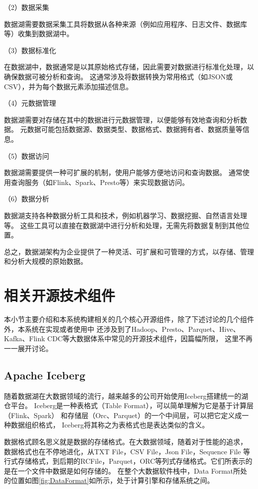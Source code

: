 （2）数据采集

数据湖需要数据采集工具将数据从各种来源（例如应用程序、日志文件、数据库等）收集到数据湖中。

（3）数据标准化

在数据湖中，数据通常是以其原始格式存储，因此需要对数据进行标准化处理，以确保数据可被分析和查询。
这通常涉及将数据转换为常用格式（如JSON或CSV），并为每个数据元素添加描述信息。

（4）元数据管理

数据湖需要对存储在其中的数据进行元数据管理，以便能够有效地查询和分析数据。
元数据可能包括数据源、数据类型、数据格式、数据拥有者、数据质量等信息。

（5）数据访问

数据湖需要提供一种可扩展的机制，使用户能够方便地访问和查询数据。
通常使用查询服务（如Flink、Spark、Presto等）来实现数据访问。

（6）数据分析

数据湖支持各种数据分析工具和技术，例如机器学习、数据挖掘、自然语言处理等。
这些工具可以直接在数据湖中进行分析和处理，无需先将数据复制到其他位置。

总之，数据湖架构为企业提供了一种灵活、可扩展和可管理的方式，以存储、管理和分析大规模的原始数据。

\section{相关开源技术组件}

本小节主要介绍和本系统构建相关的几个核心开源组件，除了下述讨论的几个组件外，本系统在实现或者使用中
还涉及到了Hadoop、Presto、Parquet、Hive、Kafka、Flink CDC等大数据体系中常见的开源技术组件，因篇幅所限，
这里不再一一展开讨论。

\subsection{Apache Iceberg}

随着数据湖在大数据领域的流行，越来越多的公司开始使用Iceberg搭建统一的湖仓平台。
Iceberg是一种表格式（Table Format），可以简单理解为它是基于计算层（Flink、Spark）
和存储层（Orc\cite{9}、Parquet\cite{10}）的一个中间层，可以把它定义成一种数据组织格式，
Iceberg将其称之为表格式也是表达类似的含义。

数据格式顾名思义就是数据的存储格式。在大数据领域，随着对于性能的追求，
数据格式也在不停地进化，从TXT File，CSV File，Json File，Sequence File
等行式存储格式，到后期的RCFile，Parquet，ORC等列式存储格式。它们所表示的是在一个文件中数据是如何存储的。
在整个大数据软件栈中，Data Format所处的位置如图\ref{fig:DataFormat}如所示，处于计算引擎和存储系统之间。

